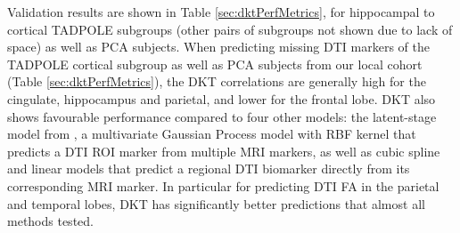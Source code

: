 \documentclass{llncs}
\begin{document}

Validation results are shown in Table \ref{sec:dktPerfMetrics}, for hippocampal to cortical TADPOLE subgroups (other pairs of subgroups not shown due to lack of space) as well as PCA subjects. When predicting missing DTI markers of the TADPOLE cortical subgroup as well as PCA subjects from our local cohort (Table \ref{sec:dktPerfMetrics}), the DKT correlations are generally high for the cingulate, hippocampus and parietal, and lower for the frontal lobe. DKT also shows favourable performance compared to four other models: the latent-stage model from \cite{jedynak2012computational}, a multivariate Gaussian Process model with RBF kernel that predicts a DTI ROI marker from multiple MRI markers, as well as cubic spline and linear models that predict a regional DTI biomarker directly from its corresponding MRI marker. In particular for predicting DTI FA in the parietal and temporal lobes, DKT has significantly better predictions that almost all methods tested.

\newcommand{\cw}{c}
\end{document}
